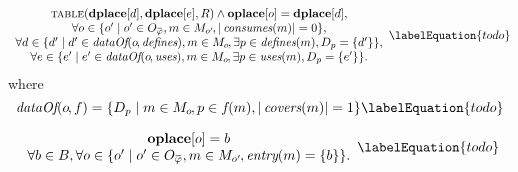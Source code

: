 \begin{equation}
  \begin{array}{c}
    \mTable(\mVar{dplace}[d], \mVar{dplace}[e], \mDomMatrix)
    \mAnd
    \mVar{oplace}[o] = \mVar{dplace}[d], \\
    \forall o \in
      \mSetBuilder{o'}%
                  {%
                    o' \in \mOpCompSet{\mPhi},
                    m \in \mMatchSet[o'] \hspace{-1pt},
                    \mCard{\mConsumes(m)} = 0
                  }, \\
    \forall d \in
      \mSetBuilder{d'}%
                  {%
                    d' \in \mDataOf(o \hspace{-1pt}, \mDefines),
                    m \in \mMatchSet[o] \hspace{-1pt},
                    \exists p \in \mDefines(m),
                    \mDataSet[p] = \mSet{d'}
                  }, \\
    \forall e \in
      \mSetBuilder{e'}%
                  {%
                    e' \in \mDataOf(o \hspace{-1pt}, \mUses),
                    m \in \mMatchSet[o] \hspace{-1pt},
                    \exists p \in \mUses(m),
                    \mDataSet[p] = \mSet{e'}
                  }.
  \end{array}
  \labelEquation{todo}
\end{equation}
%
where
%
\begin{equation}
  \mDataOf(o \hspace{-1pt}, f) =
  \mSetBuilder{\mDataSet[p]}%
              {%
                m \in \mMatchSet[o] \hspace{-1pt},
                p \in f\hspace{-1pt}(m),
                \mCard{\mCovers(m)} = 1
              }
  \labelEquation{todo}
\end{equation}



\begin{equation}
  \begin{array}{c}
    \mVar{oplace}[o] = b \\
    \forall b \in \mBlockSet,
    \forall o \in
      \mSetBuilder{o'}%
                  {%
                    o' \in \mOpCompSet{\mPhi},
                    m \in \mMatchSet[o'] \hspace{-1pt},
                    \mEntry(m) = \mSet{b}
                  }.
  \end{array}
  \labelEquation{todo}
\end{equation}

